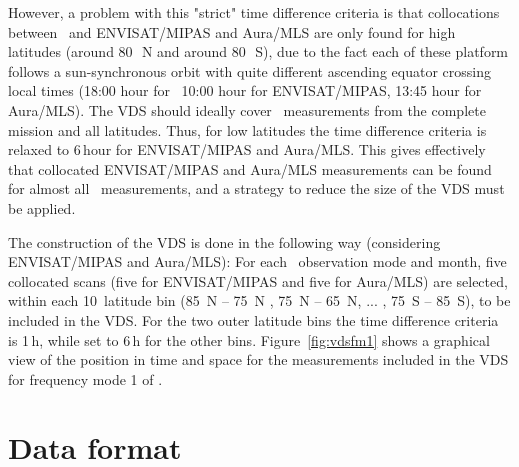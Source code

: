However, a problem with this "strict" time difference criteria
is that collocations between \smr\ and  ENVISAT/MIPAS and Aura/MLS
are only found for high latitudes (around 80\,\degree\ N and around 80\,\degree\ S),
due to the fact each of these platform follows a sun-synchronous orbit
with quite different ascending equator crossing local times  
(18:00 hour for \smr\, 10:00 hour for ENVISAT/MIPAS,
 13:45 hour for Aura/MLS).
The VDS should ideally cover \smr\ measurements from    
the complete mission and all latitudes. 
Thus, for low latitudes the time difference criteria
is relaxed to 6\,hour for ENVISAT/MIPAS and Aura/MLS.
This gives effectively that collocated ENVISAT/MIPAS and Aura/MLS 
measurements can be found for almost all \smr\ measurements, and a strategy
to reduce the size of the VDS must be applied.

The construction of the VDS is done in the following way (considering ENVISAT/MIPAS and Aura/MLS):
For each \smr\ observation mode and month, five collocated scans
(five for ENVISAT/MIPAS and five for Aura/MLS)  
are selected, within each 10\degree\ latitude bin
(85\degree\ N -- 75\degree\ N , 75\degree\ N -- 65\degree\ N, ... , 75\degree\ S -- 85\degree\ S),
to be included in the VDS. For the two outer latitude bins the
time difference criteria is 1\,h, while set to 6\,h for the other bins.  
Figure~\ref{fig:vdsfm1} shows a graphical view of the position in
time and space for the measurements included in the VDS for
frequency mode 1 of \smr.   





\section{Data format}




